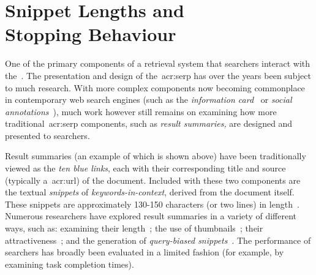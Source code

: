 
\chapter[Snippet Lengths and Stopping Behaviour]{Snippet Lengths and\\Stopping Behaviour}\label{chap:snippets}
One of the primary components of a retrieval system that searchers interact with the~. The presentation and design of the~\gls{acr:serp} has over the years been subject to much research. With more complex components now becoming commonplace in contemporary web search engines (such as the \emph{information card}~\citep{navalpakkam2013non_linear_serp, bota2016information_cards} or \emph{social annotations}~\citep{muralidharan2012social_annotations}), much work however still remains on examining how more traditional~\gls{acr:serp} components, such as \emph{result summaries,} are designed and presented to searchers.

\begin{figure}[h]
    \centering
    \vspace{4mm}
    \label{fig:serpintro}
    \vspace{-5mm}
\end{figure}

Result summaries (an example of which is shown above) have been traditionally viewed as the \emph{ten blue links}, each with their corresponding title and source (typically a~\gls{acr:url}) of the document. Included with these two components are the textual \emph{snippets} of \emph{keywords-in-context}, derived from the document itself. These snippets are approximately 130-150 characters (or two lines) in length~\citep{hearst2009_search}. Numerous researchers have explored result summaries in a variety of different ways, such as: examining their length~\citep{paek2004wavelens,cutrell2007eye_tracking,kaisser2008improving}; the use of thumbnails~\citep{woodruff2002summaries,teevan2009visual_snippets}; their attractiveness~\citep{clarke2007caption_features,he2012bridging}; and the generation of \emph{query-biased snippets}~\citep{tombros1998query_biased,rose2007snippet_attributes}. The performance of searchers has broadly been evaluated in a limited fashion (for example, by examining task completion times).

